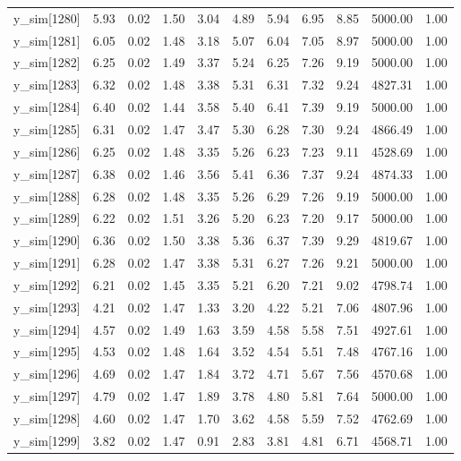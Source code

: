 \begin{table}[ht]
\begin{tabular}{rrrrrrrrrrr}
  y\_sim[1280] & 5.93 & 0.02 & 1.50 & 3.04 & 4.89 & 5.94 & 6.95 & 8.85 & 5000.00 & 1.00 \\ 
  y\_sim[1281] & 6.05 & 0.02 & 1.48 & 3.18 & 5.07 & 6.04 & 7.05 & 8.97 & 5000.00 & 1.00 \\ 
  y\_sim[1282] & 6.25 & 0.02 & 1.49 & 3.37 & 5.24 & 6.25 & 7.26 & 9.19 & 5000.00 & 1.00 \\ 
  y\_sim[1283] & 6.32 & 0.02 & 1.48 & 3.38 & 5.31 & 6.31 & 7.32 & 9.24 & 4827.31 & 1.00 \\ 
  y\_sim[1284] & 6.40 & 0.02 & 1.44 & 3.58 & 5.40 & 6.41 & 7.39 & 9.19 & 5000.00 & 1.00 \\ 
  y\_sim[1285] & 6.31 & 0.02 & 1.47 & 3.47 & 5.30 & 6.28 & 7.30 & 9.24 & 4866.49 & 1.00 \\ 
  y\_sim[1286] & 6.25 & 0.02 & 1.48 & 3.35 & 5.26 & 6.23 & 7.23 & 9.11 & 4528.69 & 1.00 \\ 
  y\_sim[1287] & 6.38 & 0.02 & 1.46 & 3.56 & 5.41 & 6.36 & 7.37 & 9.24 & 4874.33 & 1.00 \\ 
  y\_sim[1288] & 6.28 & 0.02 & 1.48 & 3.35 & 5.26 & 6.29 & 7.26 & 9.19 & 5000.00 & 1.00 \\ 
  y\_sim[1289] & 6.22 & 0.02 & 1.51 & 3.26 & 5.20 & 6.23 & 7.20 & 9.17 & 5000.00 & 1.00 \\ 
  y\_sim[1290] & 6.36 & 0.02 & 1.50 & 3.38 & 5.36 & 6.37 & 7.39 & 9.29 & 4819.67 & 1.00 \\ 
  y\_sim[1291] & 6.28 & 0.02 & 1.47 & 3.38 & 5.31 & 6.27 & 7.26 & 9.21 & 5000.00 & 1.00 \\ 
  y\_sim[1292] & 6.21 & 0.02 & 1.45 & 3.35 & 5.21 & 6.20 & 7.21 & 9.02 & 4798.74 & 1.00 \\ 
  y\_sim[1293] & 4.21 & 0.02 & 1.47 & 1.33 & 3.20 & 4.22 & 5.21 & 7.06 & 4807.96 & 1.00 \\ 
  y\_sim[1294] & 4.57 & 0.02 & 1.49 & 1.63 & 3.59 & 4.58 & 5.58 & 7.51 & 4927.61 & 1.00 \\ 
  y\_sim[1295] & 4.53 & 0.02 & 1.48 & 1.64 & 3.52 & 4.54 & 5.51 & 7.48 & 4767.16 & 1.00 \\ 
  y\_sim[1296] & 4.69 & 0.02 & 1.47 & 1.84 & 3.72 & 4.71 & 5.67 & 7.56 & 4570.68 & 1.00 \\ 
  y\_sim[1297] & 4.79 & 0.02 & 1.47 & 1.89 & 3.78 & 4.80 & 5.81 & 7.64 & 5000.00 & 1.00 \\ 
  y\_sim[1298] & 4.60 & 0.02 & 1.47 & 1.70 & 3.62 & 4.58 & 5.59 & 7.52 & 4762.69 & 1.00 \\ 
  y\_sim[1299] & 3.82 & 0.02 & 1.47 & 0.91 & 2.83 & 3.81 & 4.81 & 6.71 & 4568.71 & 1.00 \\ 

\end{tabular}
\end{table}

